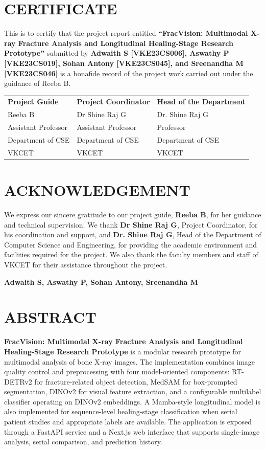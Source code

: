 \documentclass[12pt,a4paper]{article}
\begin{document}
\newpage
\section*{CERTIFICATE}
This is to certify that the project report entitled \textbf{“FracVision: Multimodal X-ray Fracture Analysis and Longitudinal Healing-Stage Research Prototype”} submitted by \textbf{Adwaith S [VKE23CS006], Aswathy P [VKE23CS019], Sohan Antony [VKE23CS045], and Sreenandha M [VKE23CS046]} is a bonafide record of the project work carried out under the guidance of Reeba B.

\vspace{25pt}
\begin{tabularx}{\textwidth}{XXX}
\textbf{Project Guide} & \textbf{Project Coordinator} & \textbf{Head of the Department}\\[8pt]
Reeba B & Dr Shine Raj G & Dr. Shine Raj G\\
Assistant Professor & Assistant Professor & Professor\\
Department of CSE & Department of CSE & Department of CSE\\
VKCET & VKCET & VKCET
\end{tabularx}

\newpage
\section*{ACKNOWLEDGEMENT}
We express our sincere gratitude to our project guide, \textbf{Reeba B}, for her guidance and technical supervision. We thank \textbf{Dr Shine Raj G}, Project Coordinator, for his coordination and support, and \textbf{Dr. Shine Raj G}, Head of the Department of Computer Science and Engineering, for providing the academic environment and facilities required for the project. We also thank the faculty members and staff of VKCET for their assistance throughout the project.

\vspace{18pt}
\hfill \textbf{Adwaith S, Aswathy P, Sohan Antony, Sreenandha M}

\newpage
\section*{ABSTRACT}
\textbf{FracVision: Multimodal X-ray Fracture Analysis and Longitudinal Healing-Stage Research Prototype} is a modular research prototype for multimodal analysis of bone X-ray images. The implementation combines image quality control and preprocessing with four model-oriented components: RT-DETRv2 for fracture-related object detection, MedSAM for box-prompted segmentation, DINOv2 for visual feature extraction, and a configurable multilabel classifier operating on DINOv2 embeddings. A Mamba-style longitudinal model is also implemented for sequence-level healing-stage classification when serial patient studies and appropriate labels are available. The application is exposed through a FastAPI service and a Next.js web interface that supports single-image analysis, serial comparison, and prediction history.
\end{document}

